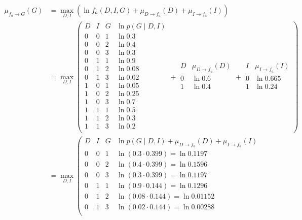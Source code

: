 \documentclass[a4paper, 12pt]{article}
\begin{document}
\begin{align}
	\mu_{f_a \to G}(G)
	&= \max_{D, I} \left(\ln f_a(D, I , G) + \mu_{D \to f_a}(D) + \mu_{I \to f_a}(I) \right)\\
	&= \max_{D, I} \left(\begin{array}{ccc|c}
		D & I & G & \ln p(G \mid D, I)\\
		\hline
		0 & 0 & 1 & \ln 0.3\\
		0 & 0 & 2 & \ln 0.4\\
		0 & 0 & 3 & \ln 0.3\\
		0 & 1 & 1 & \ln 0.9\\
		0 & 1 & 2 & \ln 0.08\\
		0 & 1 & 3 & \ln 0.02\\
		1 & 0 & 1 & \ln 0.05\\
		1 & 0 & 2 & \ln 0.25\\
		1 & 0 & 3 & \ln 0.7\\
		1 & 1 & 1 & \ln 0.5\\
		1 & 1 & 2 & \ln 0.3\\
		1 & 1 & 3 & \ln 0.2\\
	\end{array} + \begin{array}{c|c}
		D & \mu_{D \to f_a}(D)\\
		\hline
		0 & \ln 0.6\\
		1 & \ln 0.4\\
	\end{array} + \begin{array}{c|c}
		I & \mu_{I \to f_a}(I)\\
		\hline
		0 & \ln 0.665\\
		1 & \ln 0.24\\
	\end{array} \right)
	\\
	&= \max_{D, I} \left(\begin{array}{ccc|c}
		D & I & G & \ln p(G \mid D, I) + \mu_{D \to f_a}(D) + \mu_{I \to f_a}(I)\\
		\hline
		0 & 0 & 1 & \ln (0.3 \cdot 0.399) = \ln 0.1197\\
		0 & 0 & 2 & \ln (0.4 \cdot 0.399) = \ln 0.1596\\
		0 & 0 & 3 & \ln (0.3 \cdot 0.399) = \ln 0.1197\\
		0 & 1 & 1 & \ln (0.9 \cdot 0.144) = \ln 0.1296\\
		0 & 1 & 2 & \ln (0.08 \cdot 0.144) = \ln 0.01152\\
		0 & 1 & 3 & \ln (0.02 \cdot 0.144) = \ln 0.00288\\

\end{array}
\end{align}
\end{document}
